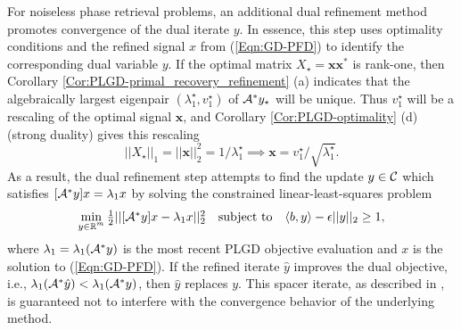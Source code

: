 For noiseless phase retrieval problems, an additional dual refinement method promotes convergence of the dual iterate $y$.  In essence, this step uses optimality conditions and the refined signal $x$ from (\ref{Eqn:GD-PFD}) to identify the corresponding dual variable $y$.  If the optimal matrix $X_\star = \mathbf{x}\mathbf{x}^*$ is rank-one, then Corollary \ref{Cor:PLGD-primal_recovery_refinement} (a) indicates that the algebraically largest eigenpair $(\lambda_1^\star, v_1^\star)$ of ${\mathcal A}^*y_\star$ will be unique.  Thus $v_1^\star$ will be a rescaling of the optimal signal $\mathbf{x}$, and  Corollary \ref{Cor:PLGD-optimality} (d) (strong duality) gives this rescaling
\[
||X_\star||_1 = ||\mathbf{x}||_2^2 = 1/ \lambda_1^\star \implies \mathbf{x} = v_1^\star / \sqrt{\lambda_1^\star}.
\]  
As a result, the dual refinement step attempts to find the update $y \in {\mathcal C}$ which satisfies $ [{\mathcal A}^* y]x = \lambda_1 x$ by solving the constrained linear-least-squares problem
\begin{equation} 	\label{Eqn:GD-DFP}
\begin{array}{lcr}
\min\limits_{\substack{ y \in \mathbb{R}^m}} \frac{1}{2} || [{\mathcal A}^* y]x - \lambda_1 x ||_2^2
	&	\textnormal{subject to} 	&	 \langle b, y \rangle - \epsilon ||y||_2 \geq 1,
\end{array}
\end{equation}
where $\lambda_1 = \lambda_1 ({\mathcal A}^*y)$ is the most recent PLGD objective evaluation and $x$ is the solution to (\ref{Eqn:GD-PFD}).  If the refined iterate $\hat{y}$ improves the dual objective, i.e., $\lambda_1 ({\mathcal A}^*\hat{y}) < \lambda_1 ({\mathcal A}^*y)$, then $\hat{y}$ replaces $y$.  This spacer iterate, as described in \cite[Proposition 1.2.5]{bertsekas2016nonlinear}, is guaranteed not to interfere with the convergence behavior of the underlying method.




